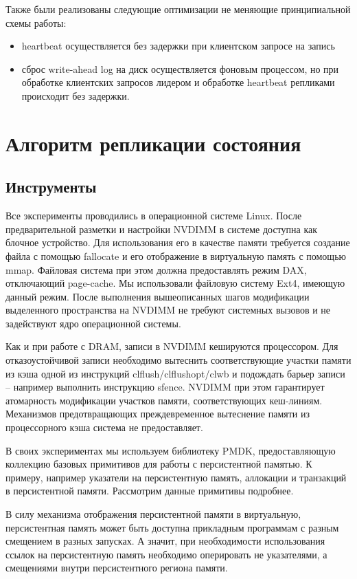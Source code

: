 \documentclass[pdftex,ptm,12pt,a4paper]{report}
\theoremstyle{definition}
\begin{document}
Также были реализованы следующие оптимизации не меняющие принципиальной схемы работы:
\begin{itemize}
\item heartbeat осуществляется без задержки при клиентском запросе на запись
\item сброс write-ahead log на диск осуществляется фоновым процессом, но при обработке клиентских запросов лидером и обработке heartbeat репликами происходит без задержки.
\end{itemize}

\chapter{Алгоритм репликации состояния}
\section{Инструменты}

Все эксперименты проводились в операционной системе Linux. После предварительной разметки и настройки NVDIMM в системе доступна как блочное устройство.
Для использования его в качестве памяти требуется создание файла с помощью fallocate
и его отображение в виртуальную память с помощью mmap. Файловая система при этом должна предоставлять режим DAX, отключающий page-cache. Мы использовали файловую систему Ext4, имеющую данный режим.
После выполнения вышеописанных шагов модификации выделенного пространства на NVDIMM не требуют системных вызовов и не задействуют ядро операционной системы.

Как и при работе с DRAM, записи в NVDIMM кешируются процессором.
Для отказоустойчивой записи необходимо вытеснить соответствующие участки памяти из кэша одной из инструкций clflush/clflushopt/clwb
и подождать барьер записи -- например выполнить инструкцию sfence.
NVDIMM при этом гарантирует атомарность модификации участков памяти, соответствующих кеш-линиям.
Механизмов предотвращающих преждевременное вытеснение памяти из процессорного кэша система не предоставляет.

В своих экспериментах мы используем библиотеку PMDK, предоставляющую коллекцию базовых примитивов для работы с персистентной памятью.
К примеру, например указатели на персистентную память, аллокации и транзакций в персистентной памяти. Рассмотрим данные примитивы подробнее.

В силу механизма отображения персистентной памяти в виртуальную, персистентная память может быть доступна прикладным программам с разным смещением в разных запусках.
А значит, при необходимости использования ссылок на персистентную память необходимо оперировать не указателями, а смещениями внутри персистентного региона памяти.
\end{document}
